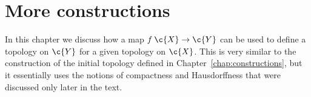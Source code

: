 \chapter{More constructions}\label{chap:more-constructions}

In this chapter we discuss how a map $f\:\c{X}\to \c{Y}$ can be used to define a topology on $\c{Y}$ for a given topology on $\c{X}$.
This is very similar to the construction of the initial topology defined in Chapter~\ref{chap:constructions}, but
it essentially uses the notions of compactness and Hausdorffness that were discussed only later in the text.








